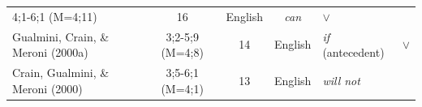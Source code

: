 \documentclass[oneside]{report}
\theoremstyle{definition}
\theoremstyle{definition}
\theoremstyle{definition}
\theoremstyle{remark}
\begin{document}
\begin{longtable}[]{@{}lccclc@{}}
\begin{minipage}[t]{0.07\columnwidth}
4;1-6;1 (M=4;11)\strut
\end{minipage} & \begin{minipage}[t]{0.05\columnwidth}\centering\strut
16\strut
\end{minipage} & \begin{minipage}[t]{0.10\columnwidth}\centering\strut
English\strut
\end{minipage} & \begin{minipage}[t]{0.25\columnwidth}\raggedright\strut
\emph{can}\strut
\end{minipage} & \begin{minipage}[t]{0.13\columnwidth}\centering\strut
\(\lor\)\strut
\end{minipage}\tabularnewline
\begin{minipage}[t]{0.23\columnwidth}\raggedright\strut
Gualmini, Crain, \& Meroni (2000a)\strut
\end{minipage} & \begin{minipage}[t]{0.07\columnwidth}\centering\strut
3;2-5;9 (M=4;8)\strut
\end{minipage} & \begin{minipage}[t]{0.05\columnwidth}\centering\strut
14\strut
\end{minipage} & \begin{minipage}[t]{0.10\columnwidth}\centering\strut
English\strut
\end{minipage} & \begin{minipage}[t]{0.25\columnwidth}\raggedright\strut
\emph{if} (antecedent)\strut
\end{minipage} & \begin{minipage}[t]{0.13\columnwidth}\centering\strut
\(\lor\)\strut
\end{minipage}\tabularnewline
\begin{minipage}[t]{0.23\columnwidth}\raggedright\strut
Crain, Gualmini, \& Meroni (2000)\strut
\end{minipage} & \begin{minipage}[t]{0.07\columnwidth}\centering\strut
3;5-6;1 (M=4;1)\strut
\end{minipage} & \begin{minipage}[t]{0.05\columnwidth}\centering\strut
13\strut
\end{minipage} & \begin{minipage}[t]{0.10\columnwidth}\centering\strut
English\strut
\end{minipage} & \begin{minipage}[t]{0.25\columnwidth}\raggedright\strut
\emph{will not}\strut

\end{minipage}
\end{longtable}
\end{document}

